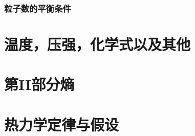 \documentclass[UTF8]{ctexart}
\numberwithin{equation}{section}%
\numberwithin{figure}{section}%
\begin{document}
    \subsubsection{粒子数的平衡条件}








    \section{温度，压强，化学式以及其他}\label{chap8}

    \section*{第II部分\quad 熵}
    \label{part2}
    \section{热力学定律与假设}\label{chap9}


    
\end{document}
